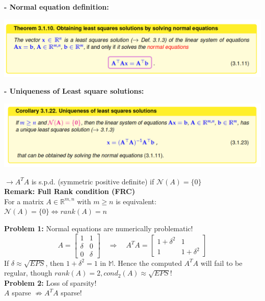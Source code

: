 \documentclass[12pt, a4paper]{article}
\newcommand{\R}{\mathbb{R}}
\newcommand{\M}{\mathbb{M}}
\begin{document}
\textbf{- Normal equation definition:}
\begin{center}
	\includegraphics[width=380pt]{normalEquationDef.png}
\end{center}

\textbf{- Uniqueness of Least square solutions:}
\begin{center}
	\includegraphics[width=380pt]{normalEquationUniqueness.png}
\end{center}


$\rightarrow A^TA$ is \color{blue}s.p.d. (symmetric positive definite) \color{black} if $\mathcal{N}(A) = \lbrace 0 \rbrace$ \\

\textbf{Remark: Full Rank condition (FRC)} \\
For a matrix $A \in \R^{m,n}$ with $m \geq n$ is equivalent: \quad $\mathcal{N}(A) = \lbrace 0 \rbrace \Leftrightarrow rank(A)=n$ \\

\begin{tcolorbox}
\color{red}\textbf{Problem 1:} Normal equations are numerically problematic! \\

\[ 
	A = 
	\begin{bmatrix}
	1 & 1 \\ 
	\delta & 0 \\
	0 & \delta	
	\end{bmatrix}
	\quad
	\Rightarrow
	\quad
	A^TA = 
	\begin{bmatrix}
	1 + \delta^2 & 1 \\
	1 & 1 + \delta^2 	
	\end{bmatrix}
\] 
If $\delta \approx \sqrt{EPS}$, then $1 + \delta^2 = 1$ in $\M$. Hence the computed $A^TA$ will fail to be regular, though $rank(A) = 2, cond_2(A) \approx \sqrt{EPS}$! \hspace{3mm}\\

\textbf{Problem 2:} Loss of sparsity! \\
$A$ sparse $\not \Rightarrow A^TA$  sparse!
\end{tcolorbox}
\end{document}
